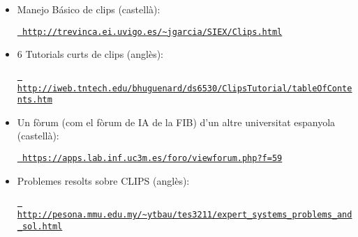 \documentclass[11pt,svgnames]{scrbook}
\begin{document}
\begin{itemize}
\item Manejo Básico de clips (castellà):

\href{http://trevinca.ei.uvigo.es/~jgarcia/SIEX/Clips.html}{{\tt
http://trevinca.ei.uvigo.es/\~{}jgarcia/SIEX/Clips.html}}

\item 6 Tutorials curts de clips (anglès):

\href{http://iweb.tntech.edu/bhuguenard/ds6530/ClipsTutorial/tableOfContents.htm}
{{\tt
http://iweb.tntech.edu/bhuguenard/ds6530/ClipsTutorial/tableOfContents.htm}}

\item Un fòrum (com el fòrum de IA de la FIB) d'un altre universitat espanyola
(castellà):

\href{https://apps.lab.inf.uc3m.es/foro/viewforum.php?f=59}{{\tt
https://apps.lab.inf.uc3m.es/foro/viewforum.php?f=59}}
\item Problemes resolts sobre CLIPS (anglès):

\href{
http://pesona.mmu.edu.my/~ytbau/tes3211/expert_systems_problems_and_sol.html}{{\tt
http://pesona.mmu.edu.my/\~{}ytbau/tes3211/expert\_systems\_problems\_and\_sol.html}}

\end{itemize}
\end{document}
